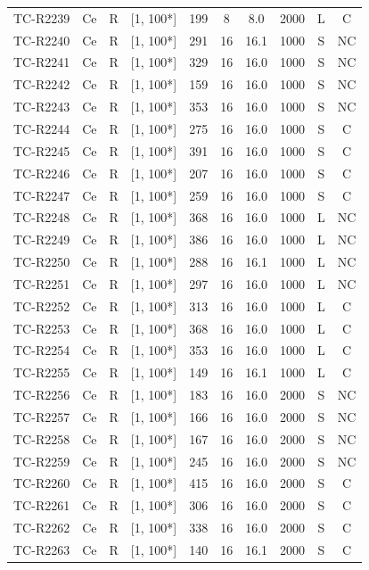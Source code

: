 \begin{longtable}{lccccccccc}
TC-R2239 & Ce & R & [1, 100*] & 199 & 8 & 8.0 & 2000 & L & C \\
TC-R2240 & Ce & R & [1, 100*] & 291 & 16 & 16.1 & 1000 & S & NC \\
TC-R2241 & Ce & R & [1, 100*] & 329 & 16 & 16.0 & 1000 & S & NC \\
TC-R2242 & Ce & R & [1, 100*] & 159 & 16 & 16.0 & 1000 & S & NC \\
TC-R2243 & Ce & R & [1, 100*] & 353 & 16 & 16.0 & 1000 & S & NC \\
TC-R2244 & Ce & R & [1, 100*] & 275 & 16 & 16.0 & 1000 & S & C \\
TC-R2245 & Ce & R & [1, 100*] & 391 & 16 & 16.0 & 1000 & S & C \\
TC-R2246 & Ce & R & [1, 100*] & 207 & 16 & 16.0 & 1000 & S & C \\
TC-R2247 & Ce & R & [1, 100*] & 259 & 16 & 16.0 & 1000 & S & C \\
TC-R2248 & Ce & R & [1, 100*] & 368 & 16 & 16.0 & 1000 & L & NC \\
TC-R2249 & Ce & R & [1, 100*] & 386 & 16 & 16.0 & 1000 & L & NC \\
TC-R2250 & Ce & R & [1, 100*] & 288 & 16 & 16.1 & 1000 & L & NC \\
TC-R2251 & Ce & R & [1, 100*] & 297 & 16 & 16.0 & 1000 & L & NC \\
TC-R2252 & Ce & R & [1, 100*] & 313 & 16 & 16.0 & 1000 & L & C \\
TC-R2253 & Ce & R & [1, 100*] & 368 & 16 & 16.0 & 1000 & L & C \\
TC-R2254 & Ce & R & [1, 100*] & 353 & 16 & 16.0 & 1000 & L & C \\
TC-R2255 & Ce & R & [1, 100*] & 149 & 16 & 16.1 & 1000 & L & C \\
TC-R2256 & Ce & R & [1, 100*] & 183 & 16 & 16.0 & 2000 & S & NC \\
TC-R2257 & Ce & R & [1, 100*] & 166 & 16 & 16.0 & 2000 & S & NC \\
TC-R2258 & Ce & R & [1, 100*] & 167 & 16 & 16.0 & 2000 & S & NC \\
TC-R2259 & Ce & R & [1, 100*] & 245 & 16 & 16.0 & 2000 & S & NC \\
TC-R2260 & Ce & R & [1, 100*] & 415 & 16 & 16.0 & 2000 & S & C \\
TC-R2261 & Ce & R & [1, 100*] & 306 & 16 & 16.0 & 2000 & S & C \\
TC-R2262 & Ce & R & [1, 100*] & 338 & 16 & 16.0 & 2000 & S & C \\
TC-R2263 & Ce & R & [1, 100*] & 140 & 16 & 16.1 & 2000 & S & C \\

\end{longtable}
